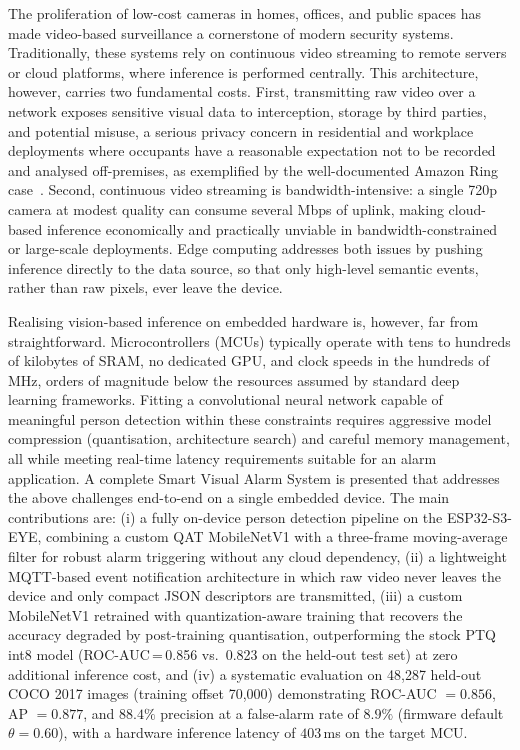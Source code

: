 \documentclass[conference]{IEEEtran}
\begin{document}
The proliferation of low-cost cameras in homes, offices, and public spaces has made video-based surveillance a cornerstone of modern security systems. Traditionally, these systems rely on continuous video streaming to remote servers or cloud platforms, where inference is performed centrally. This architecture, however, carries two fundamental costs. First, transmitting raw video over a network exposes sensitive visual data to interception, storage by third parties, and potential misuse, a serious privacy concern in residential and workplace deployments where occupants have a reasonable expectation not to be recorded and analysed off-premises, as exemplified by the well-documented Amazon Ring case~\cite{ftc2023ring}. Second, continuous video streaming is bandwidth-intensive: a single 720p camera at modest quality can consume several Mbps of uplink, making cloud-based inference economically and practically unviable in bandwidth-constrained or large-scale deployments. Edge computing addresses both issues by pushing inference directly to the data source, so that only high-level semantic events, rather than raw pixels, ever leave the device.

Realising vision-based inference on embedded hardware is, however, far from straightforward. Microcontrollers (MCUs) typically operate with tens to hundreds of kilobytes of SRAM, no dedicated GPU, and clock speeds in the hundreds of MHz, orders of magnitude below the resources assumed by standard deep learning frameworks. Fitting a convolutional neural network capable of meaningful person detection within these constraints requires aggressive model compression (quantisation, architecture search) and careful memory management, all while meeting real-time latency requirements suitable for an alarm application.
A complete Smart Visual Alarm System is presented that addresses the above challenges end-to-end on a single embedded device. The main contributions are: (i) a fully on-device person detection pipeline on the ESP32-S3-EYE, combining a custom QAT MobileNetV1 with a three-frame moving-average filter for robust alarm triggering without any cloud dependency, (ii) a lightweight MQTT-based event notification architecture in which raw video never leaves the device and only compact JSON descriptors are transmitted, (iii) a custom MobileNetV1 retrained with quantization-aware training that recovers the accuracy degraded by post-training quantisation, outperforming the stock PTQ int8 model (ROC-AUC\,=\,0.856 vs.\ 0.823 on the held-out test set) at zero additional inference cost, and (iv) a systematic evaluation on 48,287 held-out COCO 2017 images (training offset 70{,}000) demonstrating ROC-AUC $= 0.856$, AP $= 0.877$, and $88.4\%$ precision at a false-alarm rate of $8.9\%$ (firmware default $\theta\!=\!0.60$), with a hardware inference latency of $403$\,ms on the target MCU.
\end{document}
